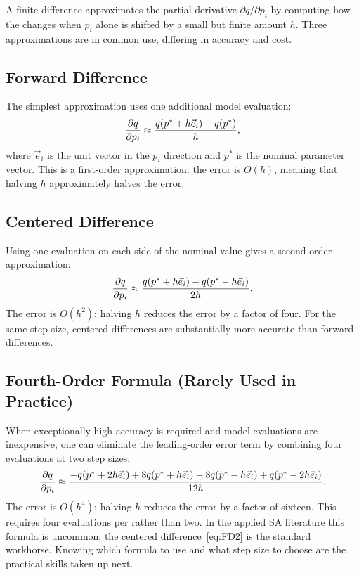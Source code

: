 A finite difference approximates the partial derivative
$\partial q/\partial p_i$ by computing how the \QOI changes when
$p_i$ alone is shifted by a small but finite amount $h$.
Three approximations are in common use, differing in accuracy and cost.

\subsection{Forward Difference}

The simplest approximation uses one additional model evaluation:
\begin{equation}
  \frac{\partial q}{\partial p_i} \approx \frac{q(p^* + h\vec{e}_i) - q(p^*)}{h},
  \label{eq:FD1}
\end{equation}
where $\vec{e}_i$ is the unit vector in the $p_i$ direction and
$p^*$ is the nominal parameter vector.
This is a first-order approximation: the error is $O(h)$,
meaning that halving $h$ approximately halves the error.

\subsection{Centered Difference}

Using one evaluation on each side of the nominal value gives
a second-order approximation:
\begin{equation}
  \frac{\partial q}{\partial p_i} \approx \frac{q(p^* + h\vec{e}_i) - q(p^* - h\vec{e}_i)}{2h}.
  \label{eq:FD2}
\end{equation}
The error is $O(h^2)$: halving $h$ reduces the error by a factor of four.
For the same step size, centered differences are substantially more
accurate than forward differences.

\subsection{Fourth-Order Formula (Rarely Used in Practice)}

When exceptionally high accuracy is required and model evaluations
are inexpensive, one can eliminate the leading-order error term
by combining four evaluations at two step sizes:
\begin{equation}
  \frac{\partial q}{\partial p_i} \approx
    \frac{-q(p^*+2h\vec{e}_i) + 8q(p^*+h\vec{e}_i)
          - 8q(p^*-h\vec{e}_i) + q(p^*-2h\vec{e}_i)}{12h}.
  \label{eq:FD4}
\end{equation}
The error is $O(h^4)$: halving $h$ reduces the error by a factor of
sixteen. This requires four evaluations per \POI rather than two.
In the applied SA literature this formula is uncommon; the
centered difference~\eqref{eq:FD2} is the standard workhorse.
Knowing which formula to use and what step size to choose are the
practical skills taken up next.

